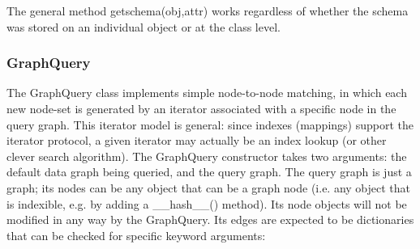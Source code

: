 \documentclass{howto}
\begin{document}
The general method getschema(obj,attr) works regardless of whether the schema was stored on an individual object or at the class level.

\subsubsection{GraphQuery}

The GraphQuery class implements simple node-to-node matching, in which each new node-set is generated by an iterator associated with a specific node in the query graph.  This iterator model is general: since indexes (mappings) support the iterator protocol, a given iterator may actually be an index lookup (or other clever search algorithm).  The GraphQuery constructor takes two arguments: the default data graph being queried, and the query graph.  The query graph is just a graph; its nodes can be any object that can be a graph node (i.e. any object that is indexible, e.g. by adding a __hash__() method).  Its node objects will not be modified in any way by the GraphQuery.  Its edges are expected to be dictionaries that can be checked for specific keyword arguments:
\end{document}
